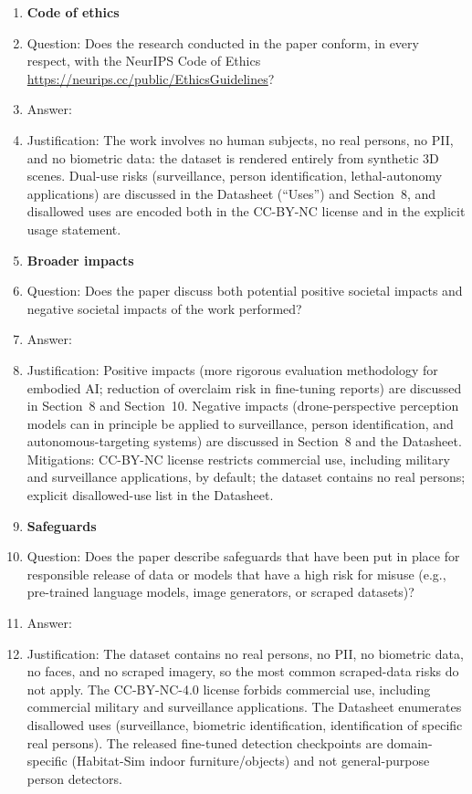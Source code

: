 \begin{enumerate}
\item {\bf Code of ethics}
    \item[] Question: Does the research conducted in the paper conform, in every respect, with the NeurIPS Code of Ethics \url{https://neurips.cc/public/EthicsGuidelines}?
    \item[] Answer: \answerYes{}
    \item[] Justification: The work involves no human subjects, no real persons, no PII, and no biometric data: the dataset is rendered entirely from synthetic 3D scenes. Dual-use risks (surveillance, person identification, lethal-autonomy applications) are discussed in the Datasheet (``Uses'') and Section~8, and disallowed uses are encoded both in the CC-BY-NC license and in the explicit usage statement.

\item {\bf Broader impacts}
    \item[] Question: Does the paper discuss both potential positive societal impacts and negative societal impacts of the work performed?
    \item[] Answer: \answerYes{}
    \item[] Justification: Positive impacts (more rigorous evaluation methodology for embodied AI; reduction of overclaim risk in fine-tuning reports) are discussed in Section~8 and Section~10. Negative impacts (drone-perspective perception models can in principle be applied to surveillance, person identification, and autonomous-targeting systems) are discussed in Section~8 and the Datasheet. Mitigations: CC-BY-NC license restricts commercial use, including military and surveillance applications, by default; the dataset contains no real persons; explicit disallowed-use list in the Datasheet.
\item {\bf Safeguards}
    \item[] Question: Does the paper describe safeguards that have been put in place for responsible release of data or models that have a high risk for misuse (e.g., pre-trained language models, image generators, or scraped datasets)?
    \item[] Answer: \answerYes{}
    \item[] Justification: The dataset contains no real persons, no PII, no biometric data, no faces, and no scraped imagery, so the most common scraped-data risks do not apply. The CC-BY-NC-4.0 license forbids commercial use, including commercial military and surveillance applications. The Datasheet enumerates disallowed uses (surveillance, biometric identification, identification of specific real persons). The released fine-tuned detection checkpoints are domain-specific (Habitat-Sim indoor furniture/objects) and not general-purpose person detectors.

\end{enumerate}
